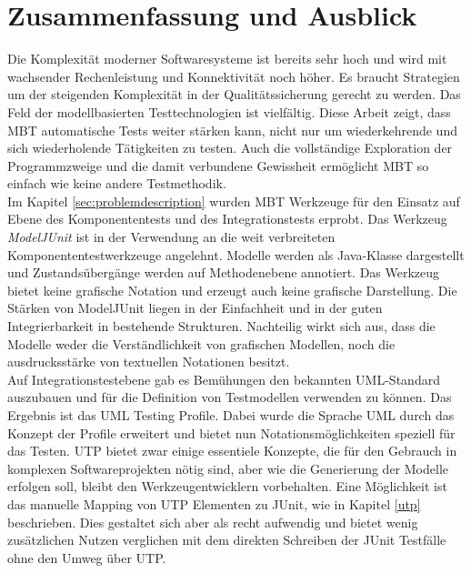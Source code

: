 \chapter{Zusammenfassung und Ausblick}
\label{sec:conclusion}
Die Komplexität moderner Softwaresysteme ist bereits sehr hoch und wird mit wachsender Rechenleistung und Konnektivität noch höher. Es braucht Strategien um der steigenden Komplexität in der Qualitätssicherung gerecht zu werden. Das Feld der modellbasierten Testtechnologien ist vielfältig. Diese Arbeit zeigt, dass \Gls{MBT} automatische Tests weiter stärken kann, nicht nur um wiederkehrende und sich wiederholende Tätigkeiten zu testen. Auch die vollständige Exploration der Programmzweige und die damit verbundene Gewissheit ermöglicht \Gls{MBT} so einfach wie keine andere Testmethodik.\\
Im Kapitel \ref{sec:problemdescription}  wurden \Gls{MBT} Werkzeuge für den Einsatz auf Ebene des Komponententests und des Integrationstests erprobt. Das Werkzeug \textit{ModelJUnit} ist in der Verwendung an die weit verbreiteten Komponententestwerkzeuge angelehnt. Modelle werden als Java-Klasse dargestellt und Zustandsübergänge werden auf Methodenebene annotiert. Das Werkzeug bietet keine grafische Notation und erzeugt auch keine grafische Darstellung. Die Stärken von ModelJUnit liegen in der Einfachheit und in der guten Integrierbarkeit in bestehende Strukturen. Nachteilig wirkt sich aus, dass die Modelle weder die Verständlichkeit von grafischen Modellen, noch die ausdrucksstärke von textuellen Notationen besitzt.\\
Auf Integrationstestebene gab es Bemühungen den bekannten UML-Standard auszubauen und für die Definition von Testmodellen verwenden zu können. Das Ergebnis ist das UML Testing Profile. Dabei wurde die Sprache UML durch das Konzept der Profile erweitert und bietet nun Notationsmöglichkeiten speziell für das Testen. UTP bietet zwar einige essentiele Konzepte, die für den Gebrauch in komplexen Softwareprojekten nötig sind, aber wie die Generierung der Modelle erfolgen soll, bleibt den Werkzeugentwicklern vorbehalten. Eine Möglichkeit ist das manuelle Mapping von UTP Elementen zu JUnit, wie in Kapitel \ref{utp} beschrieben. Dies gestaltet sich aber als recht aufwendig und bietet wenig zusätzlichen Nutzen verglichen mit dem direkten Schreiben der JUnit Testfälle ohne den Umweg über UTP.\\
